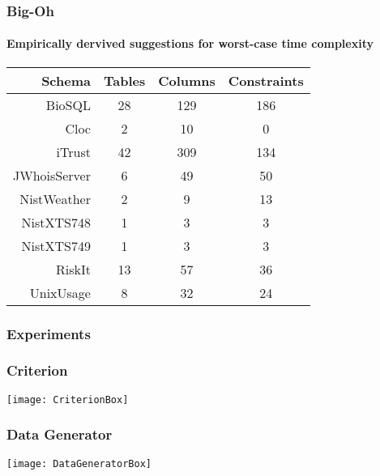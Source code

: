 \begin{frame}
  \frametitle{Big-Oh}
  \framesubtitle{Empirically dervived suggestions for worst-case time
    complexity}

  \begin{center}

  {\normalsize
  \begin{tabular}{r | c c c}
                           Schema & Tables & Columns & Constraints \\ \hline
    BioSQL                        & 28     & 129     & 186 \\
    Cloc                          & 2      & 10      & 0 \\
    iTrust                        & 42     & 309     & 134 \\
    JWhoisServer                  & 6      & 49      & 50 \\
    NistWeather                   & 2      & 9       & 13 \\
    NistXTS748                    & 1      & 3       & 3 \\
    NistXTS749                    & 1      & 3       & 3 \\
    RiskIt                        & 13     & 57      & 36 \\
    UnixUsage                     & 8      & 32      & 24
\end{tabular}}

\end{center}

\end{frame}

\begin{frame}
\frametitle{Experiments}
\centering


\end{frame}

\begin{frame}
\frametitle{Criterion}
\texttt{[image: CriterionBox]}

\begin{figure}
\begin{centering}
\end{centering}
\end{figure}

\end{frame}

\begin{frame}
\frametitle{Data Generator}
\texttt{[image: DataGeneratorBox]}

\begin{figure}
  \begin{centering}
\end{centering}
\end{figure}
\end{frame}
